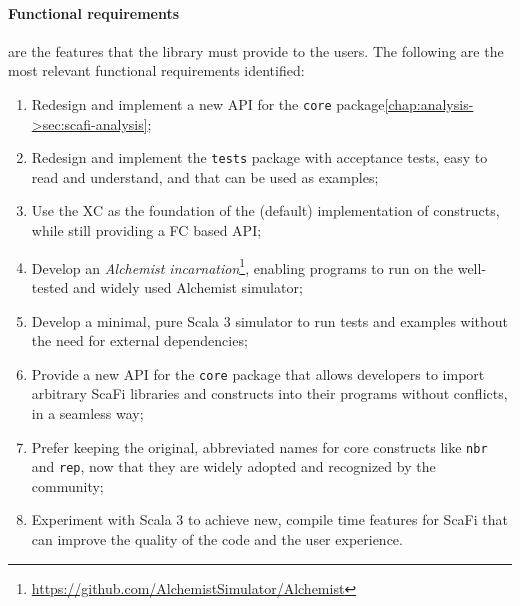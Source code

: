 \paragraph{Functional requirements} are the features that the library must provide to the users. The following are the most relevant functional requirements identified:
\begin{enumerate}[label=\textbf{F.\arabic*}]
    \item Redesign and implement a new \ac{API} for the \texttt{core} package\cref{chap:analysis->sec:scafi-analysis};
    \item Redesign and implement the \texttt{tests} package with acceptance tests, easy to read and understand, and that can be used as examples;
    \item Use the \ac{XC} as the foundation of the (default) implementation of constructs, while still providing a \ac{FC} based API;
    \item Develop an \textit{Alchemist incarnation}\footnote{\url{https://github.com/AlchemistSimulator/Alchemist}}\cite{alchemist}, enabling \this programs to run on the well-tested and widely used Alchemist simulator;
    \item Develop a minimal, pure Scala 3 simulator to run tests and examples without the need for external dependencies;
    \item Provide a new API for the \texttt{core} package that allows developers to import arbitrary ScaFi libraries and constructs into their programs without conflicts, in a seamless way;
    \item Prefer keeping the original, abbreviated names for core constructs like \texttt{nbr} and \texttt{rep}, now that they are widely adopted and recognized by the community;
    \item Experiment with Scala 3 to achieve new, compile time features for ScaFi that can improve the quality of the code and the user experience.
\end{enumerate}

